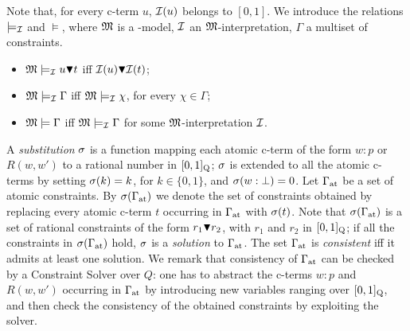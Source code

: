 Note that, for every c-term $u$, $\mathcal{I}(u)$ belongs to $[0,1]$.
 We introduce the relations
$\models_{\mathcal{I}}$ and $\models$, where $\mathfrak{M}$ is a \GWM-model, $\mathcal{I}$ an
$\mathfrak{M}$-interpretation, $\Gamma$ a multiset of constraints.
\begin{itemize}
\item $\mathfrak{M}\models_{\mathcal{I}} u \blacktriangledown t$ iff   $\mathcal{I}(u)  \blacktriangledown \mathcal{I}(t)$;
  
\item $\mathfrak{M}\models_{\mathcal{I}} \Gamma$ iff $\mathfrak{M}\models_{\mathcal{I}}\chi$, for every
  $\chi\in\Gamma$;

\item $\mathfrak{M}\models \Gamma$ iff $\mathfrak{M}\models_{\mathcal{I}} \Gamma$ for some
  $\mathfrak{M}$-interpretation $\mathcal{I}$.
\end{itemize}
A \emph{substitution} $\sigma$ is a function mapping each atomic c-term of
the form $w : p$ or $R(w,w')$ to a rational number in $[0,1]_{\mathrm{Q}}$; $\sigma$
is extended to all the atomic c-terms by setting $\sigma(k)=k$, for
$k\in\{0,1\}$, and $\sigma(w:\bot)=0$.  Let $\Gamma_\mathrm{at}$ be a set of atomic
constraints.  By $\sigma(\Gamma_\mathrm{at})$ we denote the set of constraints obtained
by replacing every atomic c-term $t$ occurring in $\Gamma_\mathrm{at}$ with $\sigma(t)$.
Note that $\sigma(\Gamma_\mathrm{at})$ is a set of rational constraints of the form $r_1
\blacktriangledown r_2$, with $r_1$ and $r_2$ in $[0,1]_{\mathrm{Q}}$; if all the
constraints in $\sigma(\Gamma_\mathrm{at})$ hold, $\sigma$ is a \emph{solution} to $\Gamma_\mathrm{at}$.
The set $\Gamma_\mathrm{at}$ is \emph{consistent} iff it admits at least one
solution.  We remark that consistency of $\Gamma_\mathrm{at}$ can be checked by a
Constraint Solver over $Q$: one has to abstract the c-terms $w : p$
and $R(w,w')$ occurring in $\Gamma_\mathrm{at}$ by introducing new variables ranging
over $[0,1]_{\mathrm{Q}}$, and then check the consistency of the obtained
constraints by exploiting the solver.

